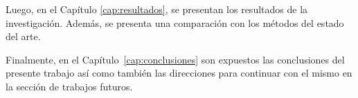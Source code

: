 Luego, en el Capítulo  \ref{cap:resultados}, se presentan los resultados de la investigación. Además, se presenta una comparación con los métodos del estado del arte.

Finalmente, en el Capítulo~\ref{cap:conclusiones} son expuestos las conclusiones del presente trabajo así como también las direcciones para continuar con el mismo en la sección de trabajos futuros.









